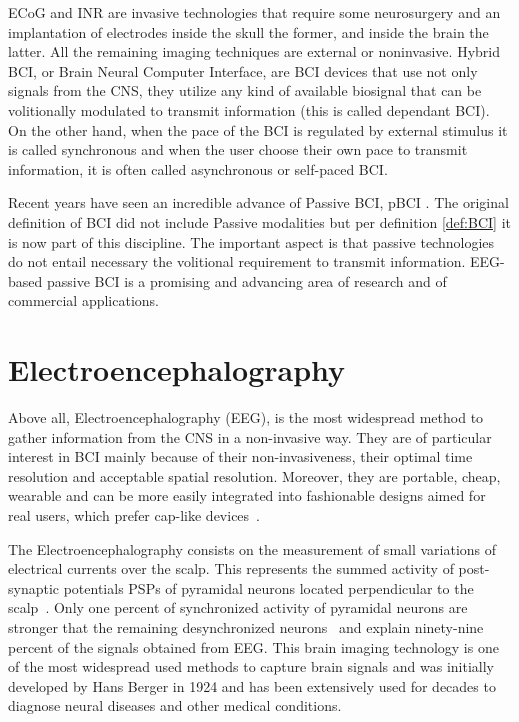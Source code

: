 ECoG and INR are invasive technologies that require some neurosurgery and an implantation of electrodes inside the skull the former, and inside the brain the latter.  All the remaining imaging techniques are external or noninvasive.  Hybrid BCI, or Brain Neural Computer Interface, are BCI devices that use not only signals from the CNS, they utilize any kind of available biosignal that can be volitionally modulated to transmit information (this is called dependant BCI).  On the other hand, when the pace of the BCI is regulated by external stimulus it is called synchronous and when the user choose their own pace to transmit information, it is often called asynchronous or self-paced BCI.

Recent years have seen an incredible advance of Passive BCI, pBCI \cite{Zander2010}.  The original definition of BCI did not include Passive modalities but per definition \ref{def:BCI} it is now part of this discipline.  The important aspect is that passive technologies do not entail necessary the volitional requirement to transmit information.  EEG-based passive BCI is a promising and advancing area of research and of commercial applications.

\section{Electroencephalography}

Above all, Electroencephalography (EEG), is the most widespread method to gather information from the CNS in a non-invasive way. They are of particular interest in BCI mainly because of their non-invasiveness, their optimal time resolution and acceptable spatial resolution. Moreover, they are portable, cheap, wearable and can be more easily integrated into fashionable designs aimed for real users, which prefer cap-like devices~\cite{Huggins2015}. 

The Electroencephalography consists on the measurement of small variations of electrical currents over the scalp.  This represents the summed activity of post-synaptic potentials PSPs of pyramidal neurons located perpendicular to the scalp~\cite{Nam2018}. Only one percent of synchronized activity of pyramidal neurons are stronger that the remaining desynchronized neurons~\cite{Schomer2010} and explain ninety-nine percent of the signals obtained from EEG.  This brain imaging technology is one of the most widespread used methods to capture brain signals and was initially developed by Hans Berger in 1924 and has been extensively used for decades to diagnose neural diseases and other medical conditions.

